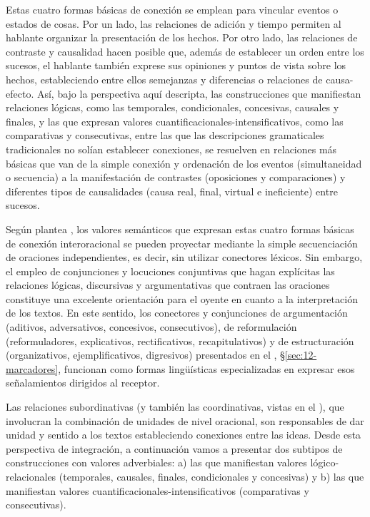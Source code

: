 Estas cuatro formas básicas de conexión se emplean para vincular eventos o
estados de cosas. Por un lado, las relaciones de adición y tiempo permiten al
hablante organizar la presentación de los hechos. Por otro lado, las relaciones
de contraste y causalidad hacen posible que, además de establecer un orden entre
los sucesos, el hablante también exprese sus opiniones y puntos de vista sobre
los hechos, estableciendo entre ellos semejanzas y diferencias o relaciones de
causa-efecto. Así, bajo la perspectiva aquí descripta, las construcciones que
manifiestan relaciones lógicas, como las temporales, condicionales, concesivas,
causales y finales, y las que expresan valores cuantificacionales-intensificativos,
como las comparativas y consecutivas, entre las que las descripciones
gramaticales tradicionales no solían establecer conexiones, se resuelven en
relaciones más básicas que van de la simple conexión y ordenación de los eventos
(simultaneidad o secuencia) a la manifestación de contrastes (oposiciones y
comparaciones) y diferentes tipos de causalidades (causa real, final, virtual e
ineficiente) entre sucesos.

Según plantea \textcite{rudolph1988}, los valores semánticos que expresan estas
cuatro formas básicas de conexión interoracional se pueden proyectar mediante la
simple secuenciación de oraciones independientes, es decir, sin utilizar
conectores léxicos. Sin embargo, el empleo de conjunciones y locuciones
conjuntivas que hagan explícitas las relaciones lógicas, discursivas y
argumentativas que contraen las oraciones constituye una excelente orientación
para el oyente en cuanto a la interpretación de los textos. En este sentido, los
conectores y conjunciones de argumentación (aditivos, adversativos, concesivos,
consecutivos), de reformulación (reformuladores, explicativos, rectificativos,
recapitulativos) y de estructuración (organizativos, ejemplificativos,
digresivos) presentados en el , §\ref{sec:12-marcadores}, funcionan
como formas lingüísticas especializadas en expresar esos señalamientos dirigidos
al receptor.

Las relaciones subordinativas (y también las coordinativas, vistas en el
), que involucran la combinación de unidades de nivel oracional, son
responsables de dar unidad y sentido a los textos estableciendo conexiones entre
las ideas. Desde esta perspectiva de integración, a continuación vamos a
presentar dos subtipos de construcciones con valores adverbiales: a) las que
manifiestan valores lógico-relacionales (temporales, causales, finales,
condicionales y concesivas) y b) las que manifiestan valores
cuantificacionales-intensificativos (comparativas y consecutivas).

